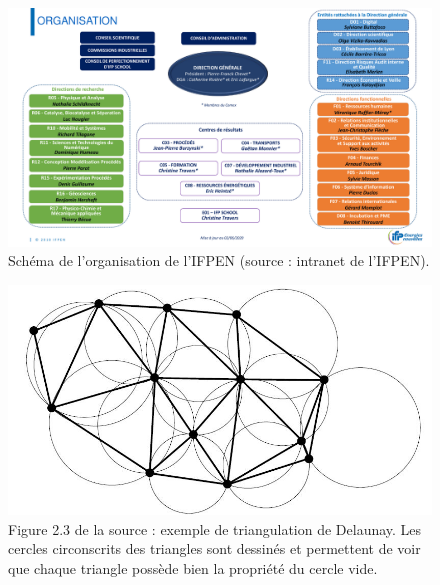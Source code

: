 \documentclass[12pt,a4paper]{report}
\begin{document}
\begin{figure}[htbp]
\begin{center}
\includegraphics[scale=0.6, angle=90]{vf-schema-organisation-ifpen-marguerite.pdf}
\caption{Schéma de l'organisation de l'IFPEN (source : intranet de l'IFPEN).}
\label{ifpen_org}
\end{center}
\end{figure}
\clearpage

\begin{figure}[t]
\begin{center}
\includegraphics[scale=0.6]{delTri.jpg}
\caption{Figure 2.3 de la source \cite{delnotes} : exemple de triangulation de Delaunay. Les cercles circonscrits des triangles sont dessinés et permettent de voir que chaque triangle possède bien la propriété du cercle vide.}
\label{delaunay}
\end{center}
\end{figure}
\end{document}

